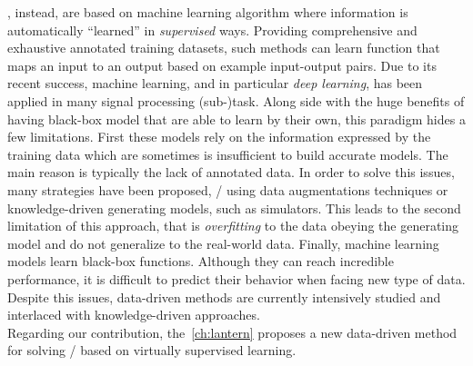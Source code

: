 , instead, are based on machine learning algorithm where information is automatically ``learned'' in \textit{supervised} ways.
Providing comprehensive and exhaustive annotated training datasets, such methods can learn function that maps an input to an output based on example input-output pairs.
Due to its recent success, machine learning, and in particular \textit{deep learning}, has been applied in many signal processing (sub-)task.
Along side with the huge benefits of having black-box model that are able to learn by their own, this paradigm hides a few limitations.
First these models rely on the information expressed by the training data which are sometimes is insufficient to build accurate models.
The main reason is typically the lack of annotated data.
In order to solve this issues, many strategies have been proposed, \eg/ using data augmentations techniques or knowledge-driven generating models, such as simulators.
This leads to the second limitation of this approach, that is \textit{overfitting} to the data obeying the generating model and do not generalize to the real-world data.
Finally, machine learning models learn black-box functions.
Although they can reach incredible performance, it is difficult to predict their behavior when facing new type of data.
Despite this issues, data-driven methods are currently intensively studied and interlaced with knowledge-driven approaches.
\\Regarding our contribution, the~\cref{ch:lantern} proposes a new data-driven method for solving \AER/ based on virtually supervised learning.